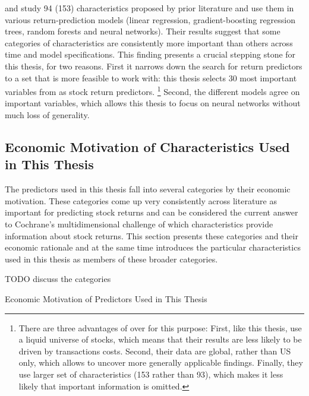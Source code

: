 			\cite{gu2020empirical} and \cite{tobek2020does} study 94 (153) characteristics proposed by prior literature and use them in various return-prediction models (linear regression, gradient-boosting regression trees, random forests and neural networks). Their results suggest that some categories of characteristics are consistently more important than others across time and model specifications. This finding presents a crucial stepping stone for this thesis, for two reasons. First it narrows down the search for return predictors to a set that is more feasible to work with: this thesis selects 30 most important variables from \cite{tobek2020does} as stock return predictors. \footnote{There are three advantages of \cite{tobek2020does} over \cite{gu2020empirical} for this purpose: First, like this thesis,  \cite{tobek2020does} use a liquid universe of stocks, which means that their results are less likely to be driven by transactions costs. Second, their data are global, rather than US only, which allows to uncover more generally applicable findings. Finally, they use larger set of characteristics (153 rather than 93), which makes it less likely that important information is omitted.} Second, the different models agree on important variables, which allows this thesis to focus on neural networks without much loss of generality. 
		
		\subsection {Economic Motivation of Characteristics Used in This Thesis}
			The predictors used in this thesis fall into several categories by their economic motivation. These categories come up very consistently across literature as important for predicting stock returns \cite{gu2020empirical, tobek2020does, harvey2016and, mclean2016does} and can be considered the current answer to Cochrane's multidimensional challenge of which characteristics provide information about stock returns. This section presents these categories and their economic rationale and at the same time introduces the particular characteristics used in this thesis as members of these broader categories.
			
			TODO discuss the categories 
 			
			\begin{table}
				\resizebox{\textwidth}{!}{}
				\caption{Economic Motivation of Predictors Used in This Thesis}
				\label{tab:characteristics_motivation}
			\end{table}
					
